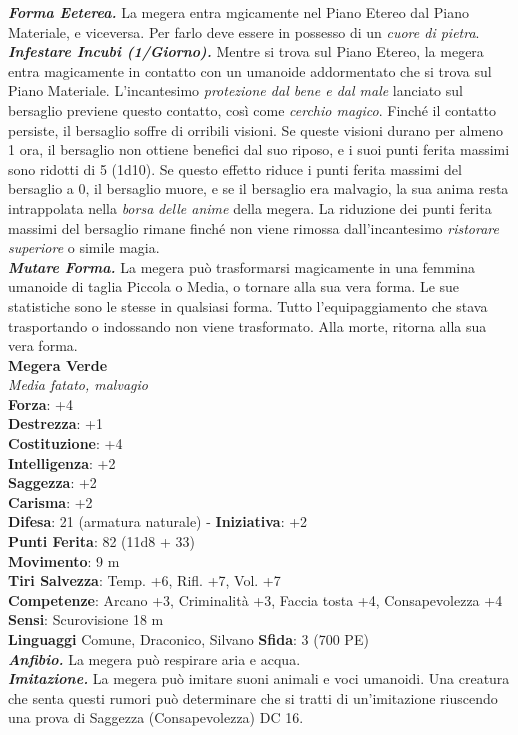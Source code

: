 \begin{multicols}{2}
\emph{\textbf{Forma Eeterea.}} La megera entra mgicamente nel Piano Etereo dal Piano Materiale, e viceversa. Per farlo deve essere in possesso di un \emph{cuore di pietra}.\\

\emph{\textbf{Infestare Incubi (1/Giorno).}} Mentre si trova sul Piano Etereo, la megera entra magicamente in contatto con un umanoide addormentato che si trova sul Piano Materiale. L'incantesimo \emph{protezione dal bene e dal male} lanciato sul bersaglio previene questo contatto, così come \emph{cerchio magico}. Finché il contatto persiste, il bersaglio soffre di orribili visioni. Se queste visioni durano per almeno 1 ora, il bersaglio non ottiene benefici dal suo riposo, e i suoi punti ferita massimi sono ridotti di 5 (1d10). Se questo effetto riduce i punti ferita massimi del bersaglio a 0, il bersaglio muore, e se il bersaglio era malvagio, la sua anima resta intrappolata nella \emph{borsa} \emph{delle anime} della megera. La riduzione dei punti ferita massimi del bersaglio rimane finché non viene rimossa dall'incantesimo \emph{ristorare} \emph{superiore} o simile magia.\\

\emph{\textbf{Mutare Forma.}} La megera può trasformarsi magicamente in una femmina umanoide di taglia Piccola o Media, o tornare alla sua vera forma. Le sue statistiche sono le stesse in qualsiasi forma. Tutto l'equipaggiamento che stava trasportando o indossando non viene trasformato. Alla morte, ritorna alla sua vera forma.\\

\medskip\textbf{Megera Verde}\\
\emph{Media fatato, malvagio}\\
\textbf{Forza}: +4\\
\textbf{Destrezza}: +1\\
\textbf{Costituzione}: +4\\
\textbf{Intelligenza}: +2\\
\textbf{Saggezza}: +2\\
\textbf{Carisma}: +2\\
\textbf{Difesa}: 21 (armatura naturale) - \textbf{Iniziativa}: +2\\
\textbf{Punti Ferita}: 82 (11d8 + 33)\\
\textbf{Movimento}: 9 m\\
\textbf{Tiri Salvezza}: Temp. +6, Rifl. +7, Vol. +7\\
\textbf{Competenze}: Arcano +3, Criminalità +3, Faccia tosta +4, Consapevolezza +4\\
\textbf{Sensi}: Scurovisione 18 m\\
\textbf{Linguaggi} Comune, Draconico, Silvano
\textbf{Sfida}: 3 (700 PE)\smallskip\\
\emph{\textbf{Anfibio.}} La megera può respirare aria e acqua.\\
\emph{\textbf{Imitazione.}} La megera può imitare suoni animali e voci umanoidi. Una creatura che senta questi rumori può determinare che si tratti di un'imitazione riuscendo una prova di Saggezza (Consapevolezza) DC  16.\\


\end{multicols}
